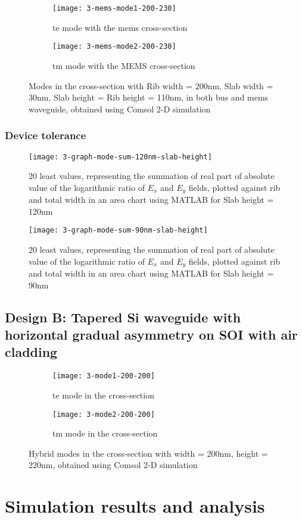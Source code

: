 \documentclass[../report.tex]{subfiles}
\begin{document}
		
\begin{figure}[H] %
	\begin{subfigure}[t]{0.45\textwidth}
		\texttt{[image: 3-mems-mode1-200-230]}
		\caption{\gls{te} mode with the \gls{mems} cross-section}
		\label{fig:3_mems_mode1_200_230}
	\end{subfigure}
	\hfill
	\begin{subfigure}[t]{0.45\textwidth}
		\texttt{[image: 3-mems-mode2-200-230]}
		\caption{\gls{tm} mode with the MEMS cross-section}
		\label{fig:3-mems-mode2-200-230}
	\end{subfigure}
	\caption{Modes in the cross-section with Rib width = 200nm, Slab width = 30nm, Slab height = Rib height = 110nm, in both bus and \gls{mems} waveguide, obtained using Comsol 2-D simulation}
\end{figure}


\subsubsection{Device tolerance}

\begin{figure}[H] %
	\centering
	\texttt{[image: 3-graph-mode-sum-120nm-slab-height]}
	\caption{20 least values, representing the summation of real part of absolute value of the logarithmic ratio of $E_x$ and $E_y$ fields, plotted against rib and total width in an area chart using MATLAB for Slab height = 120nm}
	\label{fig:3_graph_mode_sum_120nm_slab_height}
\end{figure}

\begin{figure}[H] %
	\centering
	\texttt{[image: 3-graph-mode-sum-90nm-slab-height]}
	\caption{20 least values, representing the summation of real part of absolute value of the logarithmic ratio of $E_x$ and $E_y$ fields, plotted against rib and total width in an area chart using MATLAB for Slab height = 90nm}
	\label{fig:3_graph_mode_sum_90nm_slab_height}
\end{figure}
				
		\subsection{Design B: Tapered Si waveguide with horizontal gradual asymmetry on SOI with air cladding}
		
\begin{figure}[H] %
	\begin{subfigure}[t]{0.45\textwidth}
		\texttt{[image: 3-mode1-200-200]}
		\caption{\gls{te} mode in the cross-section}
		\label{fig:3_mode1_200_200}
	\end{subfigure}
	\hfill
	\begin{subfigure}[t]{0.45\textwidth}
		\texttt{[image: 3-mode2-200-200]}
		\caption{\gls{tm} mode in the cross-section}
		\label{fig:3_mode2_200_200}
	\end{subfigure}
	\caption{Hybrid modes in the cross-section with width = 200nm, height = 220nm, obtained using Comsol 2-D simulation}
\end{figure}
	
	\section{Simulation results and analysis}
	
\end{document}
